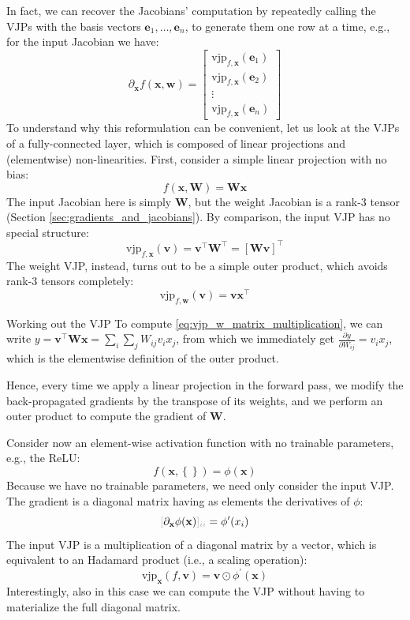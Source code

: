 In fact, we can recover the Jacobians' computation by repeatedly calling the VJPs with the basis vectors $\mathbf{e}_1, \ldots, \mathbf{e}_n$, to generate them one row at a time, e.g., for the input Jacobian we have:
%
$$
\partial_{\mathbf{x}}f(\mathbf{x},\mathbf{w})=\begin{bmatrix} \text{vjp}_{f,\mathbf{x}}(\mathbf{e}_1) \\ \text{vjp}_{f,\mathbf{x}}(\mathbf{e}_2) \\ \vdots\\ \text{vjp}_{f,\mathbf{x}}(
\mathbf{e}_n) \end{bmatrix}
$$
%
To understand why this reformulation can be convenient, let us look at the VJPs of a fully-connected layer, which is composed of linear projections and (elementwise) non-linearities. First, consider a simple linear projection with no bias:
%
$$
f(\mathbf{x}, \mathbf{W})=\mathbf{W}\mathbf{x}
$$
%
The input Jacobian here is simply $\mathbf{W}$, but the weight Jacobian is a rank-3 tensor (Section \ref{sec:gradients_and_jacobians}). By comparison, the input VJP has no special structure:
%
\begin{equation}
\text{vjp}_{f, \mathbf{x}}(\mathbf{v})=\mathbf{v}^\top\mathbf{W}^\top = \left[\mathbf{W}\mathbf{v}\right]^\top
\label{eq:vjp_x_matrix_multiplication}
\end{equation}
%
The weight VJP, instead, turns out to be a simple outer product, which avoids rank-3 tensors completely:
%
\begin{equation}
\text{vjp}_{f,\mathbf{w}}(\mathbf{v}) = \mathbf{v}\mathbf{x}^\top
\label{eq:vjp_w_matrix_multiplication}
\end{equation}
%
\begin{supportbox}{Working out the VJP}
To compute \eqref{eq:vjp_w_matrix_multiplication}, we can write $y=\mathbf{v}^\top \mathbf{W}\mathbf{x} =\sum_i\sum_j W_{ij}v_ix_j$, from which we immediately get $\frac{\partial y}{\partial W_{ij}} = v_ix_j$, which is the elementwise definition of the outer product.
\end{supportbox}
%
Hence, every time we apply a linear projection in the forward pass, we modify the back-propagated gradients by the transpose of its weights, and we perform an outer product to compute the gradient of $\mathbf{W}$. 

Consider now an element-wise activation function with no trainable parameters, e.g., the ReLU:
%
$$
f(\mathbf{x},\left\{\right\})=\phi(\mathbf{x})
$$
%
Because we have no trainable parameters, we need only consider the input VJP. The gradient is a diagonal matrix having as elements the derivatives of $\phi$:
%
$$
\idx{\partial_{\mathbf{x}} \phi(\mathbf{x})}{ii}=\phi^\prime(x_i)
$$
%
The input VJP is a multiplication of a diagonal matrix by a vector, which is equivalent to an Hadamard product (i.e., a scaling operation):
%
\begin{equation}
\text{vjp}_{\mathbf{x}}(f,\mathbf{v})=\mathbf{v}\odot \phi^\prime(\mathbf{x})
\label{eq:backward_pass_activation_function}
\end{equation}
%
Interestingly, also in this case we can compute the VJP without having to materialize the full diagonal matrix.

